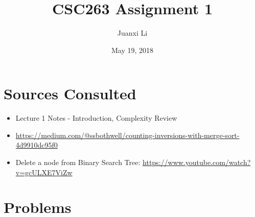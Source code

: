 \documentclass{article}
\title{CSC263 Assignment 1}
\author{Juanxi Li}
\date{May 19, 2018}
\begin{document}
\maketitle

\section*{Sources Consulted}

\begin{itemize}
    \item Lecture 1 Notes - Introduction, Complexity Review
    \item \url{https://medium.com/@ssbothwell/counting-inversions-with-merge-sort-4d9910dc95f0}
    \item Delete a node from Binary Search Tree: \url{https://www.youtube.com/watch?v=gcULXE7ViZw}

\end{itemize}

\section*{Problems}
\end{document}

